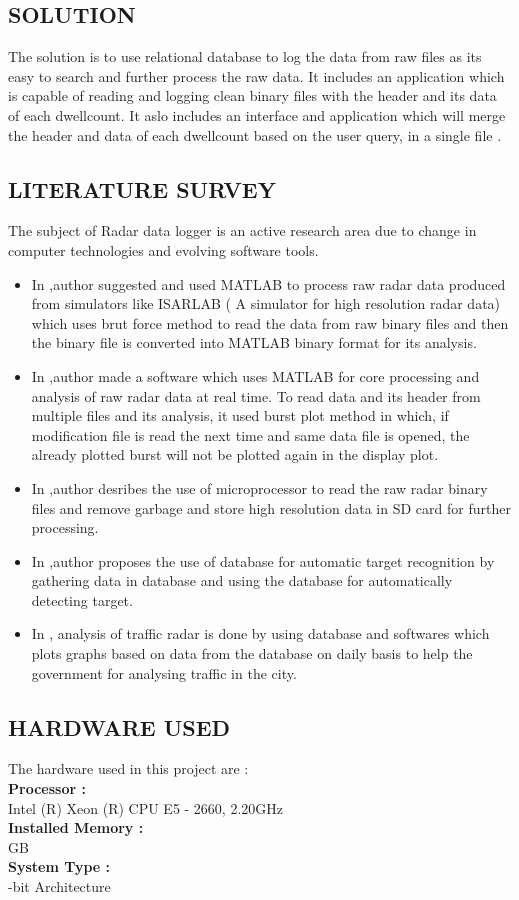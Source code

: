 \documentclass[14pt]{article} %
\begin{document}
\subsection{SOLUTION} 
 The solution is to use relational database to log the data from raw files as its easy to search and further process the raw data. It  includes an application which is capable of reading and logging clean binary files with the header and its data of each dwellcount.
 It aslo includes an interface and application which will merge the header and data of each dwellcount based on the user query,  in a single file .
 
 \subsection{LITERATURE SURVEY}
 The subject of Radar data logger is an active research area due to change in computer technologies and evolving software tools.
 \begin{itemize}
 \item In \cite{DUMMY:1},author suggested and used MATLAB to process raw radar data produced from simulators like ISARLAB ( A simulator for high resolution radar data) which uses brut force method to read the data from raw binary files and then the binary file is converted into MATLAB binary format for its analysis.
 \item In \cite{DUMMY:2},author made a software which uses MATLAB for core processing and analysis of raw radar data at real time. To read data and its header from multiple files and its analysis, it used burst plot method in which, if modification file is read the next time and same data file is opened, the already plotted burst will not be plotted again in the display plot.
 \item In \cite{DUMMY:3},author desribes the use of microprocessor to read the raw radar binary files and remove garbage and store high resolution data in SD card for further processing.
 \item In \cite{DUMMY:4},author proposes the use of database for automatic target recognition by gathering data in database and using the database for automatically detecting target.
 \item In \cite{DUMMY:5}, analysis of traffic radar is done by using database and softwares which plots graphs based on data from the database on daily basis to help the government for analysing traffic in the city.
 \end{itemize}

\subsection{HARDWARE USED}
\noindent The hardware used in this project are :\\
\textbf{Processor : } \\
\indent Intel (R) Xeon (R) CPU E5 - 2660, 2.20GHz\\
\textbf{Installed Memory : }\\
 GB\\
 \textbf{System Type : }\\
 -bit Architecture
 
\end{document}
